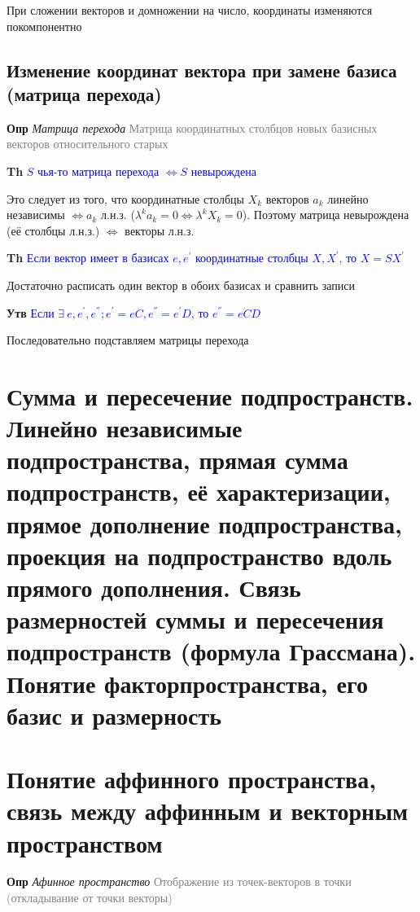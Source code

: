 \documentclass[a4paper, 14pt]{article}
\begin{document}
    При сложении векторов и домножении на число, координаты изменяются покомпонентно

    \subsection{Изменение координат вектора при замене базиса (матрица перехода)}

    \textbf{Опр} \textit{Матрица перехода} \textcolor{gray}{Матрица координатных столбцов новых базисных векторов
    относительного старых}

    \textbf{Th} \textcolor{blue}{$S$ чья-то матрица перехода $\Leftrightarrow S$ невырождена}

    Это следует из того, что координатные столбцы $X_k$ векторов $a_k$ линейно независимы $\Leftrightarrow a_k$ л.н.з.
    ($\lambda^k a_k = 0 \Leftrightarrow \lambda^k X_k = 0$).
    Поэтому матрица невырождена (её столбцы л.н.з.) $\Leftrightarrow$ векторы л.н.з.

    \textbf{Th} \textcolor{blue}{Если вектор имеет в базисах $e, e^{'}$ координатные столбцы $X, X^{'}$, то $X = SX^{'}$}

    Достаточно расписать один вектор в обоих базисах и сравнить записи

    \textbf{Утв} \textcolor{blue}{Если $\exists~e, e^{'}, e^{''}; e^{'} = eC, e^{''} = e^{'}D$, то $e^{''} = eCD$}

    Последовательно подставляем матрицы перехода

    \section{Сумма и пересечение подпространств.
    Линейно независимые подпространства, прямая сумма подпространств, её характеризации, прямое дополнение
    подпространства, проекция на подпространство вдоль прямого дополнения.
    Связь размерностей суммы и пересечения подпространств (формула Грассмана).
    Понятие факторпространства, его базис и размерность}

    


    \section{Понятие аффинного пространства, связь между аффинным и векторным пространством}

    \textbf{Опр} \textit{Афинное пространство} \textcolor{gray}{Отображение из точек-векторов в точки (откладывание
    от точки векторы)}
\end{document}
